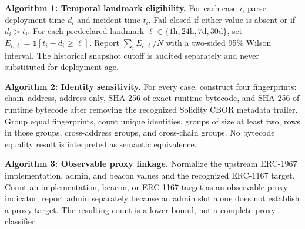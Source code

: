\begin{minipage}{0.96\linewidth}
\textbf{Algorithm 1: Temporal landmark eligibility.}
For each case $i$, parse deployment time $d_i$ and incident time $t_i$.
Fail closed if either value is absent or if $d_i>t_i$.
For each predeclared landmark $\ell\in\{1\mathrm{h},24\mathrm{h},7\mathrm{d},30\mathrm{d}\}$,
set $E_{i,\ell}=\mathbb{1}[t_i-d_i\geq\ell]$.
Report $\sum_i E_{i,\ell}/N$ with a two-sided 95\% Wilson interval.
The historical snapshot cutoff is audited separately and never substituted for deployment age.
\end{minipage}

\vspace{0.8em}
\begin{minipage}{0.96\linewidth}
\textbf{Algorithm 2: Identity sensitivity.}
For every case, construct four fingerprints: chain--address,
address only, SHA-256 of exact runtime bytecode, and SHA-256 of runtime bytecode
after removing the recognized Solidity CBOR metadata trailer.
Group equal fingerprints, count unique identities, groups of size at least two,
rows in those groups, cross-address groups, and cross-chain groups.
No bytecode equality result is interpreted as semantic equivalence.
\end{minipage}

\vspace{0.8em}
\begin{minipage}{0.96\linewidth}
\textbf{Algorithm 3: Observable proxy linkage.}
Normalize the upstream ERC-1967 implementation, admin, and beacon values and the
recognized ERC-1167 target. Count an implementation, beacon, or ERC-1167 target
as an observable proxy indicator; report admin separately because an admin slot
alone does not establish a proxy target. The resulting count is a lower bound,
not a complete proxy classifier.
\end{minipage}
